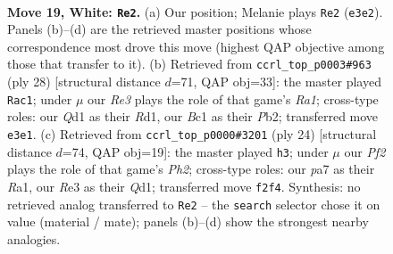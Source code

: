 \documentclass[11pt]{article}
\begin{document}
\clearpage

\begin{figure}[p]\centering
\begin{subfigure}{0.46\textwidth}\centering
\resizebox{\linewidth}{!}{%
\newchessgame
\chessboard[
  setfen={r2qk2r/ppp1b3/n4pp1/5b1p/P1pP4/2N1R2N/RPP2PPP/2BQ2K1 w kq - 0 19},
  showmover=false,
  pgfstyle=straightmove, color=movearrow, markmove={e3-e2}
]}
\caption{}
\end{subfigure}\hfill
\begin{subfigure}{0.46\textwidth}\centering
\resizebox{\linewidth}{!}{%
\newchessgame
\chessboard[
  setfen={1r1q1rk1/1pp1bpp1/2b1pn1p/p7/P2P4/1QN2NP1/1P2PPBP/R2R2K1 w - - 2 15},
  showmover=false,
  pgfstyle=straightmove, color=movearrow, markmove={a1-c1}
]}
\caption{}
\end{subfigure}
\\[4pt]
\begin{subfigure}{0.46\textwidth}\centering
\resizebox{\linewidth}{!}{%
\newchessgame
\chessboard[
  setfen={r2qk2r/3nbppp/p1p1p3/2Pp4/3P1Bb1/2N2N2/PP3PPP/R2QR1K1 w kq - 2 13},
  showmover=false,
  pgfstyle=straightmove, color=movearrow, markmove={h2-h3}
]}
\caption{}
\end{subfigure}\hfill

\caption{\textbf{Move 19, White: \texttt{Re2}.} (a) Our position; Melanie plays \texttt{Re2} (\texttt{e3e2}). Panels (b)--(d) are the retrieved master positions whose correspondence most drove this move (highest QAP objective among those that transfer to it). (b) Retrieved from \texttt{ccrl\_top\_p0003\#963} (ply 28) [structural distance $d$=71, QAP obj=33]: the master played \texttt{Rac1}; under $\mu$ our \emph{Re3} plays the role of that game's \emph{Ra1}; cross-type roles: our \emph{Q}d1 as their \emph{R}d1, our \emph{B}c1 as their \emph{P}b2; transferred move \texttt{e3e1}. (c) Retrieved from \texttt{ccrl\_top\_p0000\#3201} (ply 24) [structural distance $d$=74, QAP obj=19]: the master played \texttt{h3}; under $\mu$ our \emph{Pf2} plays the role of that game's \emph{Ph2}; cross-type roles: our \emph{p}a7 as their \emph{R}a1, our \emph{R}e3 as their \emph{Q}d1; transferred move \texttt{f2f4}. Synthesis: no retrieved analog transferred to \texttt{Re2} -- the \texttt{search} selector chose it on value (material / mate); panels (b)--(d) show the strongest nearby analogies.}
\label{fig:thought-m36}
\end{figure}

\clearpage
\end{document}
